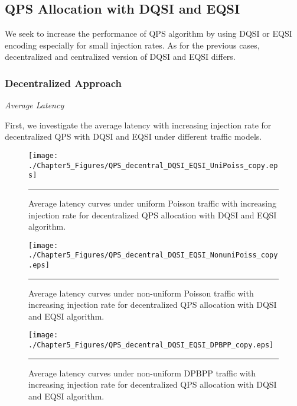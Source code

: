 \subsection{QPS Allocation with DQSI and EQSI}

We seek to increase the performance of QPS algorithm by using DQSI or EQSI encoding especially for small injection rates. As for the previous cases, decentralized and centralized version of DQSI and EQSI differs. 

\pagebreak

\subsubsection{Decentralized Approach}
\textit{Average Latency}


First, we investigate the average latency with increasing injection rate for decentralized QPS with DQSI and EQSI under different traffic models. 

\begin{figure}[htbp]
  \centering
    \texttt{[image: ./Chapter5\_Figures/QPS\_decentral\_DQSI\_EQSI\_UniPoiss\_copy.eps]}
    \rule{35em}{0.5pt}
  \caption[Decentralized QPS allocation with DQSI and EQSI average latency under uniform Poisson]{Average latency curves under uniform Poisson traffic with increasing injection rate for decentralized QPS allocation with DQSI and EQSI algorithm.}
  \label{fig:Electron}
\end{figure}


\begin{figure}[htbp]
  \centering
    \texttt{[image: ./Chapter5\_Figures/QPS\_decentral\_DQSI\_EQSI\_NonuniPoiss\_copy.eps]}
    \rule{35em}{0.5pt}
  \caption[Decentralized QPS DQSI and EQSI allocation average latency under non-uniform Poisson]{Average latency curves under non-uniform Poisson traffic with increasing injection rate for decentralized QPS allocation with DQSI and EQSI algorithm.}
  \label{fig:Electron}
\end{figure}


\begin{figure}[htbp]
  \centering
    \texttt{[image: ./Chapter5\_Figures/QPS\_decentral\_DQSI\_EQSI\_DPBPP\_copy.eps]}
    \rule{35em}{0.5pt}
  \caption[Decentralized QPS DQSI and EQSI allocation average latency under non-uniform DPBPP]{Average latency curves under non-uniform DPBPP traffic with increasing injection rate for decentralized QPS allocation with DQSI and EQSI algorithm.}
  \label{fig:Electron} 
\end{figure}

